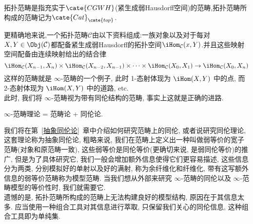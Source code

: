 \begin{definition}[拓扑范畴]
    拓扑范畴是指充实于$\cate{CGWH}$(紧生成弱Hausdorff空间)的范畴,拓扑范畴所构成的范畴记为$\cate{Cat}_{\cate{top}}$.
\end{definition}
更精确地来说,一个拓扑范畴$\mathcal{C}$由以下资料组成:一族对象以及对于每对$X,Y\in \Obj(\mathcal{C})$都配备紧生成弱Hausdorff的拓扑空间$\iHom_{\mathcal{C}}(x,Y)$.并且这些映射空间配备由连续映射给出的结合律
\[
\iHom_{\mathcal{C}}(X_{n-1},X_n)\times \iHom_{\mathcal{C}}(X_{n-2},X_{n-1})\times \cdots \times \iHom_{\mathcal{C}}(X_0,X_1) \to \iHom_{\mathcal{C}}(X_0,X_n)
\]
这样的范畴就是 $\infty$-范畴的一个例子, 此时 1-态射体现为 $\iHom(X,Y)$ 中的点, 而 2-态射体现为 $\iHom(X,Y)$ 中的道路, etc.\\
此时, 我们将 $\infty$-范畴视为带有同伦结构的范畴, 事实上这就是正确的进路.
\begin{center}
    $\infty$-范畴理论 = 范畴论 + 同伦论.
\end{center}
我们将在第~\ref{抽象同伦论}~章中介绍如何研究范畴上的同伦, 或者说研究同伦理论, 这套理论称为抽象同伦论, 粗略来说, 我们在范畴上定义出一种叫做弱等价的宽子范畴(对象和原范畴一致), 这些弱等价是同伦等价(更确切来说, 是弱同伦等价)的推广, 但是为了具体研究它, 我们一般会增加额外信息使得它们更容易描述, 这些信息分为两类, 分别模拟好的单射以及好的满射, 称为余纤维化和纤维化, 带有这写额外信息的弱等价范畴称为模型范畴. 当我们想从外部来研究 $\infty$-范畴的同伦以及 $\infty$-范畴模型的等价性时, 我们就需要它.\\
遗憾的是, 拓扑范畴所构成的范畴上无法构建良好的模型结构\cite[Lecture 2, Exercise 3.6 以及 3.7]{陈麟}, 原因在于其信息太多. 应当使用一种组合工具对其信息进行萃取, 只保留我们关心的同伦信息, 这种组合工具即为单纯集.
